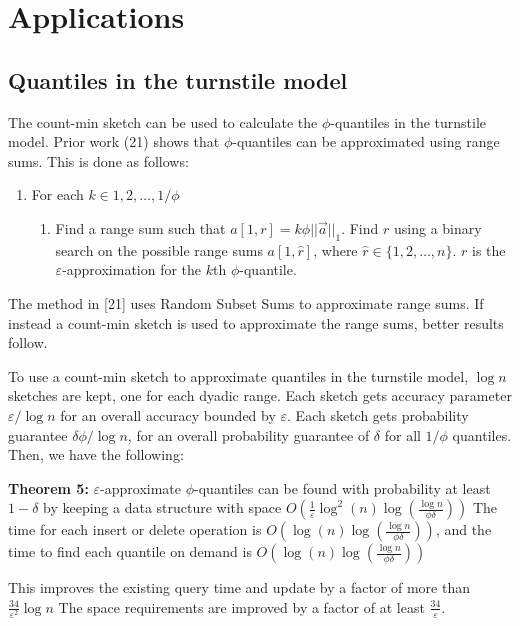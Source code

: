 \documentclass[11pt]{article}
\begin{document}
\section{Applications}

\subsection{Quantiles in the turnstile model}
The count-min sketch can be used to calculate the $\phi$-quantiles in the turnstile model.
Prior work (21) shows that $\phi$-quantiles can be approximated using range sums. This is done
as follows:
\begin{enumerate}
    \item For each $k \in {1, 2, \dots, 1/\phi}$
    \begin{enumerate}
        \item Find a range sum such that $a[1, r] = k\phi||\vec{a}||_1$. Find $r$ using a binary
        search on the possible range sums $a[1, \hat{r}]$, where $\hat{r} \in \{1, 2, \dots, n\}$.  $r$ is the
        $\varepsilon$-approximation for the $k$th $\phi$-quantile.
    \end{enumerate}
\end{enumerate}
The method in [21] uses Random Subset Sums to approximate range sums.  If instead a count-min
sketch is used to approximate the range sums, better results follow.  

To use a count-min sketch to approximate quantiles in the turnstile model, $\log n$ sketches are kept,
one for each dyadic range. Each sketch gets accuracy parameter $\varepsilon/\log n$ for an overall accuracy
bounded by $\varepsilon$. Each sketch gets probability guarantee $\delta\phi/\log n$, for
an overall probability guarantee of $\delta$ for all $1/\phi$ quantiles. Then, we have the following:

\textbf{Theorem 5:} $\varepsilon$-approximate $\phi$-quantiles can be found with probability at least
$1 - \delta$ by keeping a data structure with space $O\left(\frac{1}{\varepsilon}
\log^2(n) \log \left(\frac{\log n}{\phi \delta}\right)\right)$ The time for each insert or delete operation is
$O\left(\log(n) \log \left(\frac{\log n}{\phi \delta}\right)\right)$, and the time to find each quantile on demand 
is $O\left(\log(n)\log\left(\frac{\log n}{\phi \delta}\right)\right)$

This improves the existing query time and update by a factor of more than $\frac{34}{\varepsilon^2} \log n$
The space requirements are improved by a factor of at least $\frac{34}{\varepsilon}$. 
\end{document}
